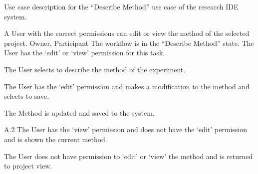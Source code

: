 \begin{table}
  \centering
  \caption{Use case description for the ``Describe Method'' use case of the research IDE system.}
  \label{tbl:use-case-describe-method}

  \begin{usecase}
    A User with the correct permissions can edit or view the method of the selected project.
    Owner, Participant
    The workflow is in the “Describe Method” state. The User has the ‘edit’ or ‘view’ permission for this task.
    \ucnormal
    \begin{ucenum}
      \item The User selects to describe the method of the experiment.
      \item The User has the ‘edit’ permission and makes a modification to the method and selects to save.
      \item The Method is updated and saved to the system.
    \end{ucenum}
    \begin{ucenum}
      \item [A.2] The User has the ‘view’ permission and does not have the ‘edit’ permission and is shown the current method.
    \end{ucenum}
    The User does not have permission to ‘edit’ or ‘view’ the method and is returned to project view.
  \end{usecase}
\end{table}


